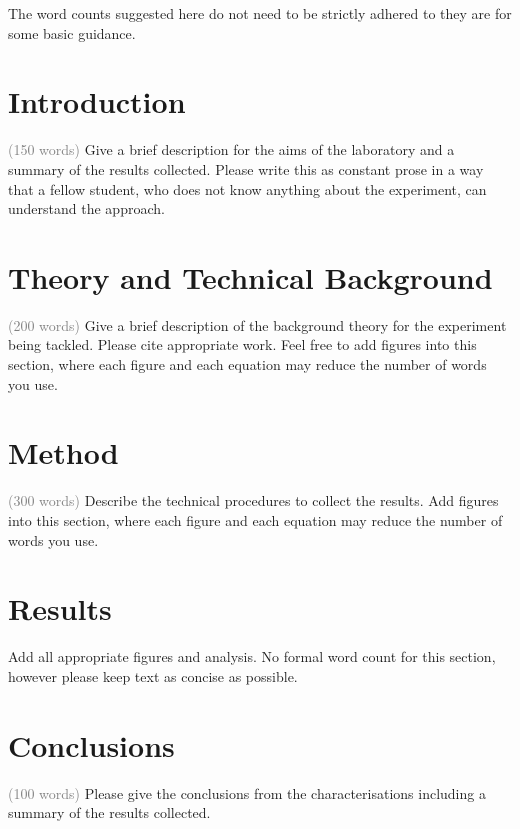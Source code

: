 \documentclass[12pt]{article}
\title{\fontsize{16pt}{18pt}\selectfont{\textbf{Lab$_i$} - XXX}}
\author{\fontsize{11pt}{13pt}\selectfont{
    Yuwei Zhao\textsuperscript{1},
    Haohao Qi\textsuperscript{2},
    Yilin Zhang\textsuperscript{3} \\
    \small\textsuperscript{1,2,3}School of Computer Science and Technology, 
    University of Science \\
    \small\textsuperscript{1,2,3}Bachelor of Engineering with Honours in Robotics
}}
\date{\fontsize{11pt}{13pt}\selectfont{\today}}
\newcommand{\wordcount}[1]{\footnotesize\textcolor{gray}{(#1 words)}}
\begin{document}
\maketitle{}
\thispagestyle{fancy}
\vspace*{-0.5em}

The word counts suggested here do not need to be strictly adhered to they are for some basic guidance.

\section*{Introduction} \wordcount{150}
Give a brief description for the aims of the laboratory and a summary of the results collected.
Please write this as constant prose in a way that a fellow student,
who does not know anything about the experiment,
can understand the approach.

\section*{Theory and Technical Background} \wordcount{200}
Give a brief description of the background theory for the experiment being tackled.
Please cite appropriate work.
Feel free to add figures into this section, where
each figure and each equation may reduce the number of words you use.

\section*{Method} \wordcount{300}
Describe the technical procedures to collect the results.
Add figures into this section, where
each figure and each equation may reduce the number of words you use.

\section*{Results}
Add all appropriate figures and analysis.
No formal word count for this section, however
please keep text as concise as possible.

\section*{Conclusions} \wordcount{100}
Please give the conclusions from the characterisations including a summary of the results collected.
\end{document}

